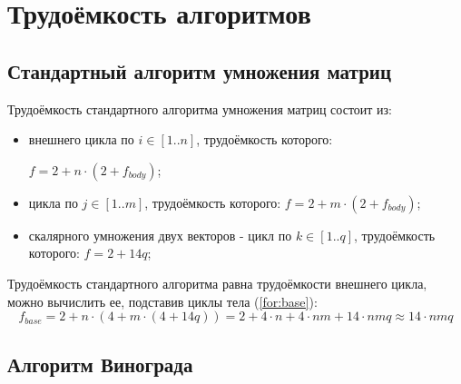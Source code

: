 \section{Трудоёмкость алгоритмов}

\subsection{Стандартный алгоритм умножения матриц}

Трудоёмкость стандартного алгоритма умножения матриц состоит из:
\begin{itemize}
	\item внешнего цикла по $i \in [1..n]$, трудоёмкость которого: 
	
	$f = 2 + n \cdot (2 + f_{body})$;
	\item цикла по $j \in [1..m]$, трудоёмкость которого: $f = 2 + m \cdot (2 + f_{body})$;
	\item скалярного умножения двух векторов - цикл по $k \in [1..q]$, трудоёмкость которого: $f = 2 + 14q$;
\end{itemize}

Трудоёмкость стандартного алгоритма равна трудоёмкости внешнего цикла, можно вычислить ее, подставив циклы тела (\ref{for:base}):
\begin{equation}
	\label{for:base}
	f_{base} = 2 + n \cdot (4 + m \cdot (4 + 14q)) = 2 + 4 \cdot n + 4 \cdot nm + 14 \cdot nmq \approx 14 \cdot nmq
\end{equation}

\subsection{Алгоритм Винограда}

